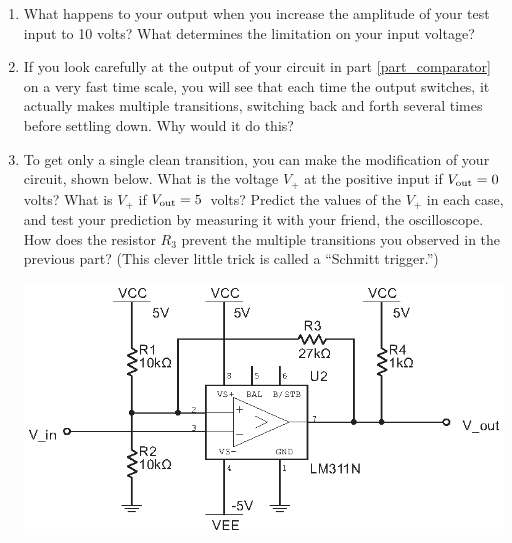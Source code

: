 \begin{enumerate}[wide]
\item What happens to your output when you increase the amplitude of your test input to 10 volts?  What determines the limitation on your input voltage?

\item If you look carefully at the output of your circuit in part \ref{part_comparator} on a very fast time scale, you will see that each time the output switches, it actually makes multiple transitions, switching back and forth several times before settling down.  Why would it do this?  

\item To get only a single clean transition, you can make the modification of your circuit, shown below.  What is the voltage $V_+$ at the positive input if $V_{\rm out}=0$ volts?  What is $V_+$ if $V_{\rm out}=5$~volts?   Predict the values of the $V_+$ in each case, and test your prediction by measuring it with your friend, the oscilloscope.  How does the resistor $R_3$ prevent the multiple transitions you observed in the previous part?  (This clever little trick is called a ``Schmitt trigger.'') \label{part_schmitt_trigger}

\begin{center}
\includegraphics{digital_electronics/schmitt_trigger.eps}
\end{center}


\end{enumerate}



